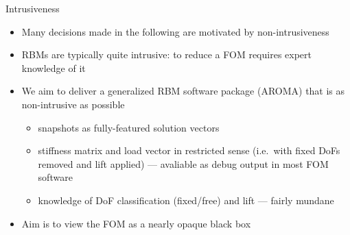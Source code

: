 \documentclass{sintefbeamer}
\begin{document}
\begin{frame}{Intrusiveness}
    \begin{itemize}
        \item Many decisions made in the following are motivated by non-intrusiveness
        \item RBMs are typically quite intrusive: to reduce a FOM requires expert knowledge of it
        \item We aim to deliver a generalized RBM software package (AROMA) that is as non-intrusive as possible
        \begin{itemize}
            \item snapshots as fully-featured solution vectors
            \item stiffness matrix and load vector in restricted sense (i.e.~with fixed DoFs removed and lift applied) --- avaliable as debug output in most FOM software
            \item knowledge of DoF classification (fixed/free) and lift --- fairly mundane
        \end{itemize}
        \item Aim is to view the FOM as a nearly opaque black box
    \end{itemize}
\end{frame}
\end{document}
